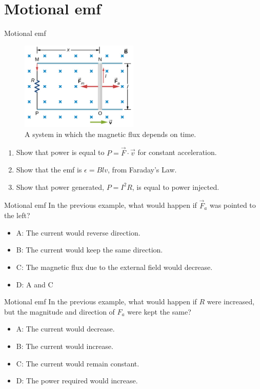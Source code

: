 \documentclass{beamer}
\begin{document}
\section{Motional emf}

\begin{frame}{Motional emf}
\small
\begin{figure}
\centering
\includegraphics[width=0.5\textwidth]{figures/loop2.png}
\caption{\label{fig:loop4} A system in which the magnetic flux depends on time.}
\end{figure}
\begin{enumerate}
\item Show that power is equal to $P = \vec{F} \cdot \vec{v}$ for constant acceleration.
\item Show that the emf is $\epsilon = B l v$, from Faraday's Law.
\item Show that power generated, $P = I^2 R$, is equal to power injected.
\end{enumerate}
\end{frame}

\begin{frame}{Motional emf}
In the previous example, what would happen if $\vec{F}_a$ was pointed to the left?
\begin{itemize}
\item A: The current would reverse direction.
\item B: The current would keep the same direction.
\item C: The magnetic flux due to the external field would decrease.
\item D: A and C
\end{itemize}
\end{frame}

\begin{frame}{Motional emf}
In the previous example, what would happen if $R$ were increased, but the magnitude and direction of $F_a$ were kept the same?
\begin{itemize}
\item A: The current would decrease.
\item B: The current would increase.
\item C: The current would remain constant.
\item D: The power required would increase.
\end{itemize}
\end{frame}
\end{document}
